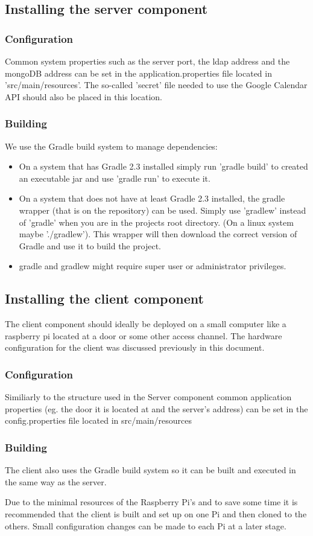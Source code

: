\subsection{Installing the server component}   

\subsubsection{Configuration}
	Common system properties such as the server port, the ldap address and the mongoDB address can be set in the application.properties file located in 'src/main/resources'. The so-called 'secret' file needed to use the Google Calendar API should also be placed in this location.
	
\subsubsection{Building}
We use the Gradle build system to manage dependencies:
	\begin{itemize}
		\item On a system that has Gradle 2.3 installed simply run 'gradle build'  to created an executable jar and use 'gradle run' to execute it.
		\item On a system that does not have at least Gradle 2.3 installed, the gradle wrapper (that is on the repository) can be used. Simply use 'gradlew' instead of 'gradle' when you are in the projects root directory. (On a linux system maybe './gradlew'). This wrapper will then download the correct version of Gradle and use it to build the project.
		\item gradle and gradlew might require super user or administrator privileges.
	\end{itemize}

\subsection{Installing the client component} 
The client component should ideally be deployed on a small computer like a raspberry pi located at a door or some other access channel. The hardware configuration for the client was discussed previously in this document.

\subsubsection{Configuration}
Similiarly to the structure used in the Server component common application properties (eg. the door it is located at and the server's address) can be set in the config.properties file located in src/main/resources

\subsubsection{Building}
The client also uses the Gradle build system so it can be built and executed in the same way as the server.

Due to the minimal resources of the Raspberry Pi's and to save some time it is recommended that the client is built and set up on one Pi and then cloned to the others. Small configuration changes can be made to each Pi at a later stage.